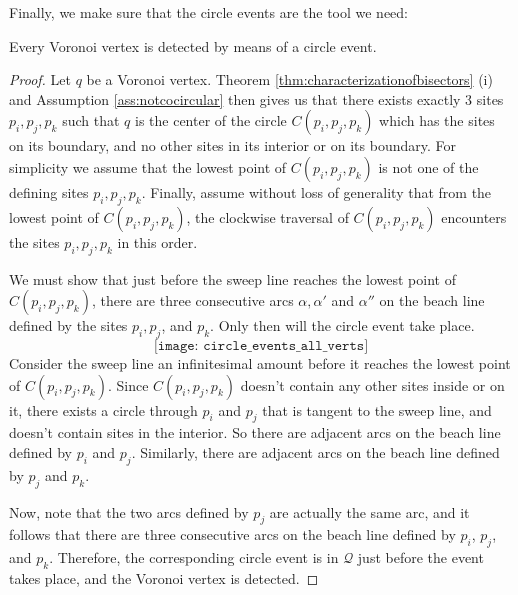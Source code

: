 Finally, we make sure that the circle events are the tool we need:
\begin{lem}
Every Voronoi vertex is detected by means of a circle event.
\end{lem}
\begin{proof}
Let $q$ be a Voronoi vertex. Theorem \ref{thm:characterizationofbisectors} (i) and Assumption \ref{ass:notcocircular} then gives us that there exists exactly 3 sites $p_i, p_j, p_k$ such that $q$ is the center of the circle $C(p_i, p_j, p_k)$ which has the sites on its boundary, and no other sites in its interior or on its boundary. For simplicity we assume that the lowest point of $C(p_i, p_j, p_k)$ is not one of the defining sites $p_i, p_j, p_k$. Finally, assume without loss of generality that from the lowest point of $C(p_i, p_j, p_k)$, the clockwise traversal of $C(p_i, p_j, p_k)$ encounters the sites $p_i, p_j, p_k$ in this order.

We must show that just before the sweep line reaches the lowest point of $C(p_i, p_j, p_k)$, there are three consecutive arcs $\alpha, \alpha'$ and $\alpha''$ on the beach line defined by the sites $p_i, p_j$, and $p_k$. Only then will the circle event take place.
\[
    \texttt{[image: circle\_events\_all\_verts]}
\]
Consider the sweep line an infinitesimal amount before it reaches the lowest point of $C(p_i, p_j, p_k)$. Since $C(p_i, p_j, p_k)$ doesn't contain any other sites inside or on it, there exists a circle through $p_i$ and $p_j$ that is tangent to the sweep line, and doesn't contain sites in the interior. So there are adjacent arcs on the beach line defined by $p_i$ and $p_j$. Similarly, there are adjacent arcs on the beach line defined by $p_j$ and $p_k$. 

Now, note that the two arcs defined by $p_j$ are actually the same arc, and it follows that there are three consecutive arcs on the beach line defined by $p_i$, $p_j$, and $p_k$. Therefore, the corresponding circle event is in $\mathcal{Q}$ just before the event takes place, and the Voronoi vertex is detected.
\end{proof}